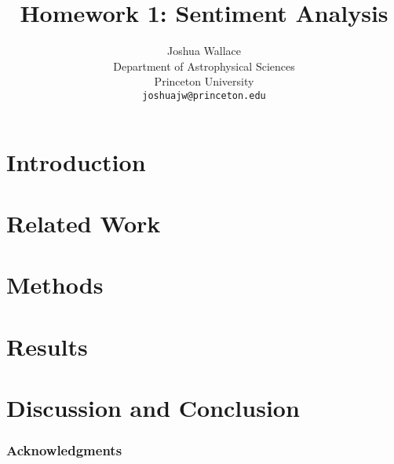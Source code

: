 \documentclass{article} %
\title{Homework 1: Sentiment Analysis}
\author{
Joshua Wallace\\
Department of Astrophysical Sciences\\
Princeton University\\
\texttt{joshuajw@princeton.edu} \\
}
\begin{document}
\maketitle

\begin{abstract}

\end{abstract}

\section{Introduction}



\section{Related Work}
\cite{zhu2009}


\section{Methods}




\section{Results}


\section{Discussion and Conclusion}


\subsubsection*{Acknowledgments}





\end{document}
